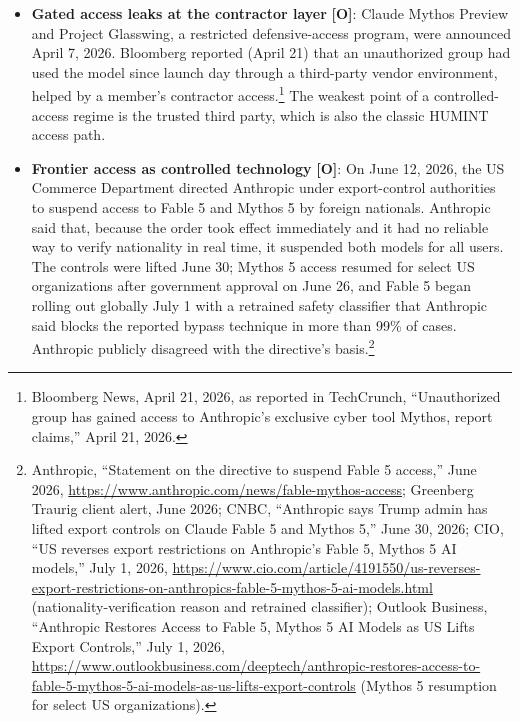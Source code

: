 \documentclass[11pt,letterpaper]{article}
\begin{document}
\begin{itemize}
  \item \textbf{Gated access leaks at the contractor layer} \textbf{[O]}: Claude Mythos Preview and Project Glasswing, a restricted defensive-access program, were announced April 7, 2026. Bloomberg reported (April 21) that an unauthorized group had used the model since launch day through a third-party vendor environment, helped by a member's contractor access.\footnote{Bloomberg News, April 21, 2026, as reported in TechCrunch, ``Unauthorized group has gained access to Anthropic's exclusive cyber tool Mythos, report claims,'' April 21, 2026.} The weakest point of a controlled-access regime is the trusted third party, which is also the classic HUMINT access path.
  \item \textbf{Frontier access as controlled technology} \textbf{[O]}: On June 12, 2026, the US Commerce Department directed Anthropic under export-control authorities to suspend access to Fable 5 and Mythos 5 by foreign nationals. Anthropic said that, because the order took effect immediately and it had no reliable way to verify nationality in real time, it suspended both models for all users. The controls were lifted June 30; Mythos 5 access resumed for select US organizations after government approval on June 26, and Fable 5 began rolling out globally July 1 with a retrained safety classifier that Anthropic said blocks the reported bypass technique in more than 99\% of cases. Anthropic publicly disagreed with the directive's basis.\footnote{Anthropic, ``Statement on the directive to suspend Fable 5 access,'' June 2026, \url{https://www.anthropic.com/news/fable-mythos-access}; Greenberg Traurig client alert, June 2026; CNBC, ``Anthropic says Trump admin has lifted export controls on Claude Fable 5 and Mythos 5,'' June 30, 2026; CIO, ``US reverses export restrictions on Anthropic's Fable 5, Mythos 5 AI models,'' July 1, 2026, \url{https://www.cio.com/article/4191550/us-reverses-export-restrictions-on-anthropics-fable-5-mythos-5-ai-models.html} (nationality-verification reason and retrained classifier); Outlook Business, ``Anthropic Restores Access to Fable 5, Mythos 5 AI Models as US Lifts Export Controls,'' July 1, 2026, \url{https://www.outlookbusiness.com/deeptech/anthropic-restores-access-to-fable-5-mythos-5-ai-models-as-us-lifts-export-controls} (Mythos 5 resumption for select US organizations).}

\end{itemize}
\end{document}
